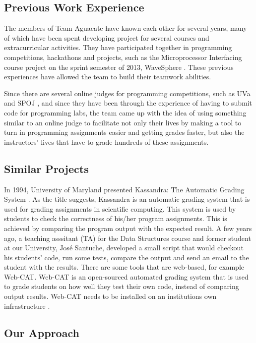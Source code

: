 
\subsection{Previous Work Experience}

The members of Team Aguacate have known each other for several years, many of
which have been spent developing project for several courses and extracurricular
activities. They have participated together in programming competitions,
hackathons and projects, such as the Microprocessor Interfacing course project
on the sprint semester of 2013, WaveSphere \cite{Micro2}. These previous
experiences have allowed the team to build their teamwork abilities.

Since there are several online judges for programming competitions, such as UVa
\cite{UVA} and SPOJ \cite{SPOJ}, and since they have been through the experience
of having to submit code for programming labs, the team came up with the idea of
using something similar to an online judge to facilitate not only their lives by
making a tool to turn in programming assignments easier and getting grades
faster, but also the instructors' lives that have to grade hundreds of these
assignments.

\subsection{Similar Projects}

In 1994, University of Maryland presented Kassandra: The Automatic Grading
System \cite{Matt1994}. As the title suggests, Kassandra is an automatic grading
system that is used for grading assignments in scientific computing. This system
is used by students to check the correctness of his/her program assignments.
This is achieved by comparing the program output with the expected result. A few
years ago, a teaching asssitant (TA) for the Data Structures course and former
student at our University, José Santuche, developed a small script that would
checkout his students' code, run some tests, compare the output and send an
email to the student with the results. There are some tools that are web-based,
for example Web-CAT. Web-CAT is an open-sourced automated grading system that is
used to grade students on how well they test their own code, instead of
comparing output results. Web-CAT needs to be installed on an institutions own
infrastructure \cite{WebCat}.

\subsection{Our Approach}

